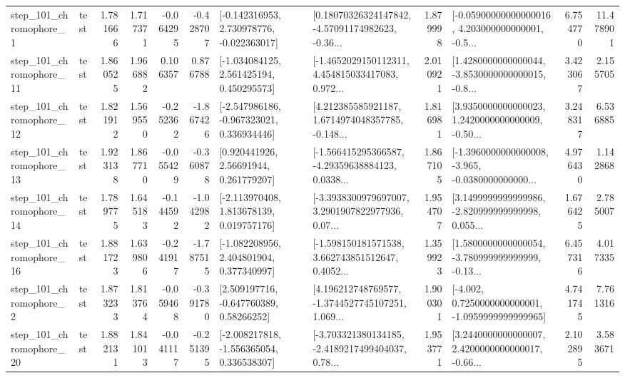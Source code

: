 \begin{tabular}{llrrrrllrlrr}
   step\_101\_chromophore\_1 &      test &      1.781666 &    1.717371 &     -0.064295 & -0.428707 &   [-0.142316953, 2.730978776, -0.022363017] &  [0.18070326324147842, -4.57091174982623, -0.36... &       1.879998 &  [-0.05900000000000016, 4.203000000000001, -0.5... &            6.754770 &         11.478901 \\
  step\_101\_chromophore\_11 &      test &      1.860525 &    1.966882 &      0.106357 &  0.876788 &    [-1.034084125, 2.561425194, 0.450295573] &  [-1.4652029150112311, 4.454815033417083, 0.972... &       2.010921 &  [1.4280000000000044, -3.8530000000000015, -0.8... &            3.423067 &          2.155705 \\
  step\_101\_chromophore\_12 &      test &      1.821912 &    1.569550 &     -0.252362 & -1.867426 &   [-2.547986186, -0.967323021, 0.336934446] &  [4.212385585921187, 1.6714974048357785, -0.148... &       1.816981 &  [3.9350000000000023, 1.2420000000000009, -0.50... &            3.248317 &          6.536885 \\
  step\_101\_chromophore\_13 &      test &      1.923138 &    1.867710 &     -0.055429 & -0.360878 &      [0.920441926, 2.56691944, 0.261779207] &  [-1.566415295366587, -4.29359638884123, 0.0338... &       1.867105 &  [-1.3960000000000008, -3.965, -0.0380000000000... &            4.976430 &          1.142868 \\
  step\_101\_chromophore\_14 &      test &      1.789775 &    1.645183 &     -0.144592 & -1.042982 &    [-2.113970408, 1.813678139, 0.019757176] &  [-3.3938300979697007, 3.2901907822977936, 0.07... &       1.954707 &  [3.1499999999999986, -2.820999999999998, 0.055... &            1.676425 &          2.785007 \\
  step\_101\_chromophore\_16 &      test &      1.881723 &    1.639806 &     -0.241917 & -1.787515 &    [-1.082208956, 2.404801904, 0.377340997] &  [-1.598150181571538, 3.662743851512647, 0.4052... &       1.359923 &  [1.5800000000000054, -3.780999999999999, -0.13... &            6.457316 &          4.017335 \\
   step\_101\_chromophore\_2 &      test &      1.873233 &    1.813764 &     -0.059468 & -0.391780 &     [2.509197716, -0.647760389, 0.58266252] &  [4.196212748769577, -1.3744527745107251, 1.069... &       1.900301 &  [-4.002, 0.7250000000000001, -1.0959999999999965] &            4.741745 &          7.761316 \\
  step\_101\_chromophore\_20 &      test &      1.882131 &    1.841013 &     -0.041117 & -0.251395 &   [-2.008217818, -1.556365054, 0.336538307] &  [-3.703321380134185, -2.4189217499404037, 0.78... &       1.953771 &  [3.2440000000000007, 2.4200000000000017, -0.66... &            2.102895 &          3.583671 \\

\end{tabular}
